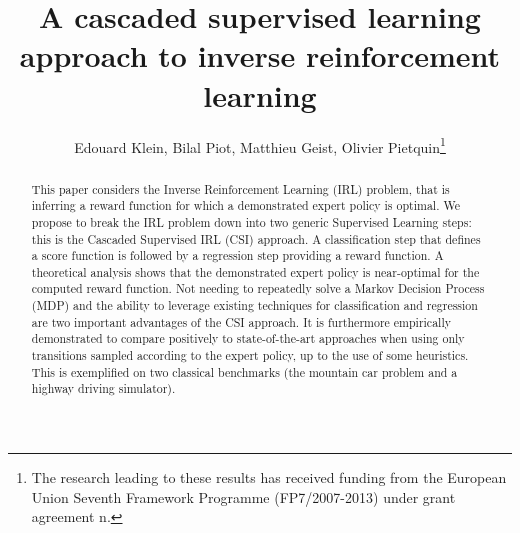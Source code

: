 \documentclass{llncs}
\begin{document}
\title{A cascaded supervised learning approach to inverse reinforcement learning}
\author{Edouard Klein, Bilal Piot, Matthieu Geist, Olivier Pietquin\thanks{The research leading to these results has received funding from the European Union Seventh Framework Programme (FP7/2007-2013) under grant agreement n.}}




\maketitle

\renewcommand*\abstractname{Abstract.}
\begin{abstract}
  This paper considers the Inverse Reinforcement Learning (IRL) problem, that is inferring a reward function for which a demonstrated expert policy is optimal.
We propose to break the IRL problem down into two generic Supervised Learning steps: this is the Cascaded Supervised IRL (CSI) approach. A classification step that defines a score function is followed by a regression step providing a reward function.
A theoretical analysis shows that the demonstrated expert policy is near-optimal for the computed reward function.
Not needing to repeatedly solve a Markov Decision Process (MDP) and the ability to leverage existing techniques for classification and regression are two important advantages of the CSI approach. It is furthermore empirically demonstrated to compare positively to state-of-the-art approaches when using only transitions sampled according to the expert policy, up to the use of some heuristics. This is exemplified on two classical benchmarks (the mountain car problem and a highway driving simulator).
  \end{abstract}
\end{document}
